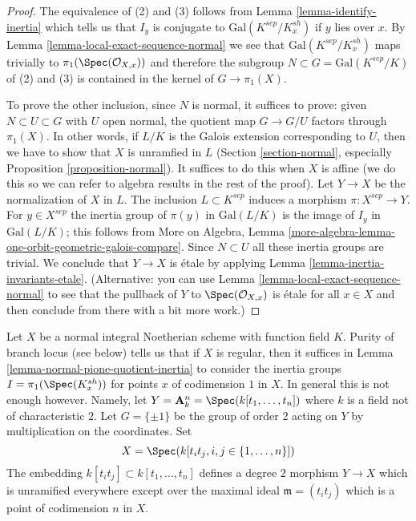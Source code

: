 \begin{proof}
The equivalence of (2) and (3) follows from
Lemma \ref{lemma-identify-inertia}
which tells us that $I_y$ is conjugate to $\text{Gal}(K^{sep}/K_x^{sh})$
if $y$ lies over $x$. By Lemma \ref{lemma-local-exact-sequence-normal}
we see that $\text{Gal}(K^{sep}/K_x^{sh})$ maps trivially to
$\pi_1(\Spec(\mathcal{O}_{X, x}))$ and therefore the subgroup
$N \subset G = \text{Gal}(K^{sep}/K)$
of (2) and (3) is contained in the kernel of
$G \longrightarrow \pi_1(X)$.

\medskip\noindent
To prove the other inclusion, since $N$ is normal, it suffices to prove:
given $N \subset U \subset G$ with $U$ open normal,
the quotient map $G \to G/U$ factors through $\pi_1(X)$.
In other words, if $L/K$ is the Galois extension corresponding
to $U$, then we have to show that $X$ is unramfied in $L$
(Section \ref{section-normal}, especially
Proposition \ref{proposition-normal}).
It suffices to do this when $X$ is affine (we do this
so we can refer to algebra results in the rest of the proof).
Let $Y \to X$ be the normalization of $X$ in $L$.
The inclusion $L \subset K^{sep}$ induces a morphism
$\pi : X^{sep} \to Y$. For $y \in X^{sep}$
the inertia group of $\pi(y)$ in $\text{Gal}(L/K)$
is the image of $I_y$ in $\text{Gal}(L/K)$; this follows
from More on Algebra, Lemma
\ref{more-algebra-lemma-one-orbit-geometric-galois-compare}.
Since $N \subset U$ all these inertia groups are trivial.
We conclude that $Y \to X$ is \'etale by applying
Lemma \ref{lemma-inertia-invariants-etale}.
(Alternative: you can use Lemma \ref{lemma-local-exact-sequence-normal}
to see that the pullback of $Y$ to $\Spec(\mathcal{O}_{X, x})$ is
\'etale for all $x \in X$ and then conclude from there
with a bit more work.)
\end{proof}

\begin{example}
\label{example-bigger-codim}
Let $X$ be a normal integral Noetherian scheme with function field $K$.
Purity of branch locus (see below) tells us that if $X$ is regular, then
it suffices in Lemma \ref{lemma-normal-pione-quotient-inertia}
to consider the inertia groups $I = \pi_1(\Spec(K_x^{sh}))$
for points $x$ of codimension $1$ in $X$.
In general this is not enough however. Namely, let
$Y = \mathbf{A}_k^n = \Spec(k[t_1, \ldots, t_n])$
where $k$ is a field not of characteristic $2$.
Let $G = \{\pm 1\}$ be the group of order $2$ acting on $Y$
by multiplication on the coordinates. Set
$$
X = \Spec(k[t_it_j, i, j \in \{1, \ldots, n\}])
$$
The embedding $k[t_it_j] \subset k[t_1, \ldots, t_n]$
defines a degree $2$ morphism $Y \to X$ which is unramified everywhere
except over the maximal ideal $\mathfrak m = (t_it_j)$
which is a point of codimension $n$ in $X$.
\end{example}

